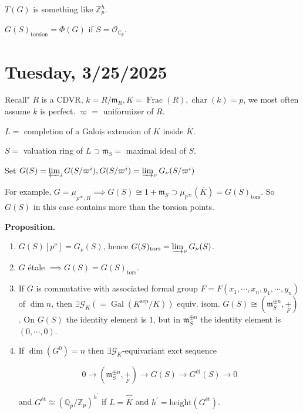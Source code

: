 \documentclass{article}
\theoremstyle{definition}
\numberwithin{theorem}{subsection}
\begin{document}
    \(T(G)\) is something like \(\mathbb{Z}_p^h\).
    
    \(G(S)_{\text{torsion}} = \Phi(G)\) if \(S=\mathcal{O}_{\mathbb{C}_p}\). 

    \section*{Tuesday, 3/25/2025}
    
    Recall" \(R\) is a CDVR, \(k = R / \mathfrak{m}_R, K = \operatorname{Frac}(R), \operatorname{char}(k) = p\), we most often assume \(k\) is perfect. \(\varpi =\) uniformizer of \(R\).

    \(L =\) completion of a Galois extension of \(K\) inside \(\overline{K}\).

    \(S =\) valuation ring of \(L \supset \mathfrak{m}_S =\) maximal ideal of \(S\).

    Set \(G(S) = \varprojlim_i G(S / \varpi^i), G(S / \varpi^i) = \varinjlim_\nu G_\nu(S / \varpi^i)\)
    
    For example, \(G = \underline{\mu}_{p^{\infty} , R} \implies G(S) \cong 1 + \mathfrak{m}_S \supset \mu_{p^{\infty}}(\overline{K}) = G(S)_{\text{tors}}\). So \(G(S)\) in this case contains more than the torsion points.
    
    \textbf{Proposition.}

    \begin{enumerate}[label=\arabic*)]
        \item \(G(S)[p^{\nu}] = G_\nu (S)\), hence \(G(S)_{\text{tors}} = \varinjlim_\nu G_\nu(S)\).
        \item \(G\) \'etale \(\implies G(S) = G(S)_{\text{tors}}\).
        \item If \(G\) is commutative with associated formal group \(F = F(x_1, \cdots , x_n, y_1, \cdots , y_n)\) of \(\dim n\), then \(\exists \mathscr{G}_K (=\operatorname{Gal}(K^{\text{sep}} / K))\) equiv. isom. \(G(S) \cong (\mathfrak{m}_S^{\oplus n},\underset{F}{+})\). On \(G(S)\) the identity element is \(1\), but in \(\mathfrak{m}_S^{\oplus n}\) the identity element is \((0, \cdots , 0)\).
        \item If \(\dim (G^0) = n\) then \(\exists \mathscr{G}_K\)-equivariant exct sequence
        
        \[
            0 \to (\mathfrak{m}_S^{\oplus n},\underset{F}{+}) \to G(S) \to G^{\text{\'et}}(S) \to 0
        \]

        and \(G^{\text{\'et}} \cong (\mathbb{Q}_p / \mathbb{Z}_p)^{h^{\prime}}\) if \(L = \widehat{\overline{K}}\) and \(h^{\prime} = \text{height}(G^{\text{\'et}})\).   
    \end{enumerate} 
\end{document}

